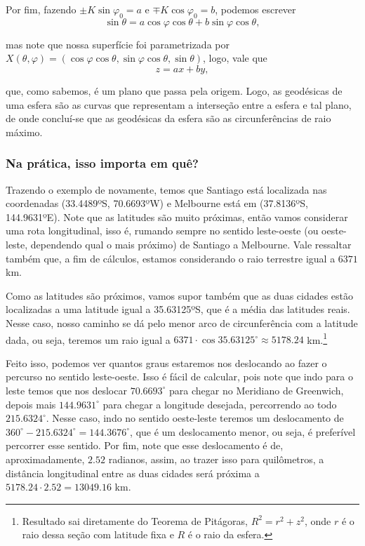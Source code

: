 \documentclass{article}
\begin{document}
Por fim, fazendo $\pm K \sin{\varphi_0} = a$ e $\mp K \cos{\varphi_0} = b$, podemos escrever
\[\sin{\theta} = a\cos{\varphi}\cos{\theta} + b\sin{\varphi}\cos{\theta},\]

\noindent mas note que nossa superfície foi parametrizada por $X(\theta, \varphi) = (\cos{\varphi}\cos{\theta}, \sin{\varphi}\cos{\theta}, \sin{\theta})$, logo, vale que
\[z = ax + by,\]

\noindent que, como sabemos, é um plano que passa pela origem. Logo, as geodésicas de uma esfera são as curvas que representam a interseção entre a esfera e tal plano, de onde concluí-se que as geodésicas da esfera são as circunferências de raio máximo.

\subsubsection{Na prática, isso importa em quê?}

Trazendo o exemplo de \cite{folha} novamente, temos que Santiago está localizada nas coordenadas (33.4489ºS, 70.6693ºW) e Melbourne está em (37.8136ºS, 144.9631ºE). Note que as latitudes são muito próximas, então vamos considerar uma rota longitudinal, isso é, rumando sempre no sentido leste-oeste (ou oeste-leste, dependendo qual o mais próximo) de Santiago a Melbourne. Vale ressaltar também que, a fim de cálculos, estamos considerando o raio terrestre igual a $6371$ km.

Como as latitudes são próximos, vamos supor também que as duas cidades estão localizadas a uma latitude igual a 35.63125ºS, que é a média das latitudes reais. Nesse caso, nosso caminho se dá pelo menor arco de circunferência com a latitude dada, ou seja, teremos um raio igual a $6371\cdot \cos{35.63125^\circ}\approx 5178.24$ km.\footnote{Resultado sai diretamente do Teorema de Pitágoras, $R^2 = r^2 + z^2$, onde $r$ é o raio dessa seção com latitude fixa e $R$ é o raio da esfera.}

Feito isso, podemos ver quantos graus estaremos nos deslocando ao fazer o percurso no sentido leste-oeste. Isso é fácil de calcular, pois note que indo para o leste temos que nos deslocar $70.6693^\circ$ para chegar no Meridiano de Greenwich, depois mais $144.9631^\circ$ para chegar a longitude desejada, percorrendo ao todo $215.6324^\circ$. Nesse caso, indo no sentido oeste-leste teremos um deslocamento de $360^\circ - 215.6324^\circ = 144.3676^\circ$, que é um deslocamento menor, ou seja, é preferível percorrer esse sentido. Por fim, note que esse deslocamento é de, aproximadamente, $2.52$ radianos, assim, ao trazer isso para quilômetros, a distância longitudinal entre as duas cidades será próxima a $5178.24\cdot 2.52 = 13049.16$ km.
\end{document}
